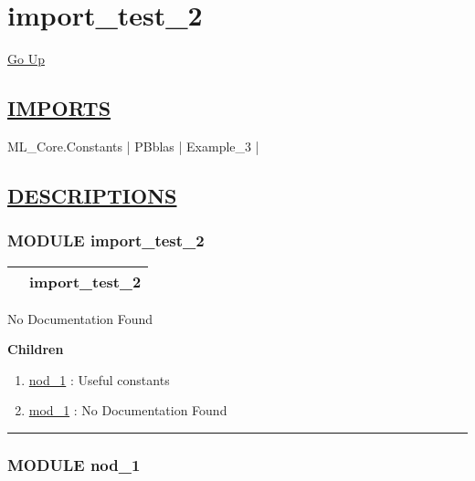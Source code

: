 \chapter*{\color{headfile}
import_test_2
}
\hypertarget{ecldoc:toc:import_test_2}{}
\hyperlink{ecldoc:toc:root}{Go Up}

\section*{\underline{\textsf{IMPORTS}}}
\begin{doublespace}
{\large
ML\_Core.Constants |
PBblas |
Example\_3 |
}
\end{doublespace}

\section*{\underline{\textsf{DESCRIPTIONS}}}
\subsection*{\textsf{\colorbox{headtoc}{\color{white} MODULE}
import\_test\_2}}

\hypertarget{ecldoc:import_test_2}{}

{\renewcommand{\arraystretch}{1.5}
\begin{tabularx}{\textwidth}{|>{\raggedright\arraybackslash}l|X|}
\hline
\hspace{0pt}\mytexttt{\color{red} } & \textbf{import\_test\_2} \\
\hline
\end{tabularx}
}

\par





No Documentation Found







\textbf{Children}
\begin{enumerate}
\item \hyperlink{ecldoc:ML_Core.Constants}{nod\_1}
: Useful constants
\item \hyperlink{ecldoc:PBblas}{mod\_1}
: No Documentation Found
\end{enumerate}

\rule{\linewidth}{0.5pt}

\subsection*{\textsf{\colorbox{headtoc}{\color{white} MODULE}
nod\_1}}

